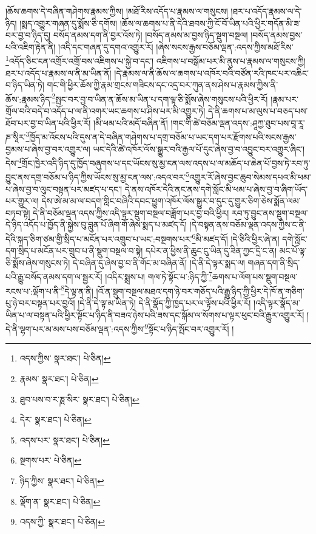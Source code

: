 །ཆོས་ཆགས་དེ་བཞིན་གཤེགས་རྣམས་ཀྱིས། །མཐོ་རིས་འདོད་པ་རྣམས་ལ་གསུངས། །ཐར་པ་འདོད་རྣམས་ལ་དེ་ཉིད། །སྨད་འགྱུར་གཞན་དུ་སྨོས་ཅི་དགོས། །ཆོས་ལ་ཆགས་པ་ནི་དེའི་ཐབས་ཀྱི་ངོ་བོ་ཡིན་པའི་ཕྱིར་གདོན་མི་ཟ་བར་བྱ་བ་ཉིད་དུ། བསོད་ནམས་དག་ནི་བྱར་འོས་ཏེ། །བསོད་ནམས་མ་བྱས་ཉིད་སྡུག་བསྔལ། །བསོད་ནམས་བྱས་པའི་འཇིག་རྟེན་ནི། །འདི་དང་གཞན་དུ་དགའ་འགྱུར་རོ། །ཞེས་སངས་རྒྱས་བཅོམ་ལྡན་:འདས་ཀྱིས་མཐོ་རིས་\footnote{འདས་ཀྱིས་  སྣར་ཐང་།  པེ་ཅིན། }འདོད་ཅིང་ངན་འགྲོར་འགྲོ་བས་འཇིགས་པ་སྐྱེ་བ་དང་། འཇིགས་པ་བསྒོམ་པར་མི་ནུས་པ་རྣམས་ལ་གསུངས་ཀྱི། ཐར་པ་འདོད་པ་རྣམས་ལ་ནི་མ་ཡིན་ནོ། །དེ་རྣམས་ལ་ནི་ཆོས་ལ་ཆགས་པ་འཁོར་བའི་བཙོན་རའི་ཁང་པར་འཆིང་བ་ཉིད་ཡིན་ཏེ། གང་གི་ཕྱིར་ཆོས་ཀྱི་རྣམ་གྲངས་གཟིངས་དང་འདྲ་བར་ཀུན་ནས་ཤེས་པ་རྣམས་ཀྱིས་ནི་ཆོས་:རྣམས་ཉིད་\footnote{རྣམས་  སྣར་ཐང་།  པེ་ཅིན། }སྤང་བར་བྱ་བ་ཡིན་ན་ཆོས་མ་ཡིན་པ་དག་ལྟ་ཅི་སྨོས་ཞེས་གསུངས་པའི་ཕྱིར་རོ། །རྣམ་པར་གྲོལ་བའི་བདེ་བ་འདོད་པ་ལ་ནི་འགར་ཡང་ཆགས་པ་ཤིས་པར་མི་འགྱུར་ཏེ། དེ་ནི་ཆགས་པ་མ་ལུས་པ་བཅད་པས་ཐོབ་པར་བྱ་བ་ཡིན་པའི་ཕྱིར་རོ། །མི་ཕམ་པའི་མདོ་བཞིན་ནོ། །གང་གི་ཚེ་བཅོམ་ལྡན་འདས་:ཤཱཀྱ་ཐུབ་པས་བཱ་རཱ་ཎ་སཱིར་\footnote{ཐུབ་པས་བ་ར་ཎཱ་སིར་  སྣར་ཐང་།  པེ་ཅིན། }ཁྱོད་མ་འོངས་པའི་དུས་ན་དེ་བཞིན་གཤེགས་པ་དགྲ་བཅོམ་པ་ཡང་དག་པར་རྫོགས་པའི་སངས་རྒྱས་བྱམས་པ་ཞེས་བྱ་བར་འགྱུར་ལ། ཡང་དེའི་ཚེ་འཁོར་ལོས་སྒྱུར་བའི་རྒྱལ་པོ་དུང་ཞེས་བྱ་བ་འབྱུང་བར་འགྱུར་ཞིང་། དེས་\footnote{དེར་  སྣར་ཐང་།  པེ་ཅིན། }གྲོང་ཁྱེར་འདི་ཉིད་དུ་ཁྱོད་བཞུགས་པ་དང་ཡོངས་སུ་མྱ་ངན་ལས་འདས་པ་ལ་མཆོད་པ་ཆེན་པོ་བྱས་ཏེ་རབ་ཏུ་བྱུང་ནས་དགྲ་བཅོམ་པ་ཉིད་ཀྱིས་ཡོངས་སུ་མྱ་ངན་ལས་:འདའ་བར་\footnote{འདས་པར་  སྣར་ཐང་།  པེ་ཅིན། }འགྱུར་རོ་ཞེས་བྱང་ཆུབ་སེམས་དཔའ་མི་ཕམ་པ་ཞེས་བྱ་བ་ལུང་བསྟན་པར་མཛད་པ་དང་། དེ་ནས་འཁོར་དེའི་ནང་ནས་དགེ་སློང་མི་ཕམ་པ་ཞེས་བྱ་བ་ཞིག་ཡོད་པར་གྱུར་ལ། དེས་ཨེ་མ་མ་ལ་བདག་གླིང་བཞིའི་དབང་ཕྱུག་འཁོར་ལོས་སྒྱུར་བ་དུང་དུ་གྱུར་ཅིག་ཅེས་སྨོན་ལམ་བཏབ་སྟེ། དེ་ནི་བཅོམ་ལྡན་འདས་ཀྱིས་འདི་ལྟར་སྡུག་བསྔལ་བཟློག་པར་བྱ་བའི་ཕྱིར། རབ་ཏུ་བྱུང་ནས་སྡུག་བསྔལ་དེ་ཉིད་འདོད་པ་ཁྱོད་ནི་སྐྱེས་བུ་བླུན་པོ་ཞིག་གོ་ཞེས་སྨད་པ་མཛད་དོ། །དེ་བསྟན་ནས་བཅོམ་ལྡན་འདས་ཀྱིས་ང་ནི་དེའི་སྐད་ཅིག་ཙམ་གྱི་སྲིད་པ་མངོན་པར་འགྲུབ་པ་ཡང་:བསྔགས་པར་\footnote{སྔགས་པར་  པེ་ཅིན། }མི་མཛད་དོ། །དེ་ཅིའི་ཕྱིར་ཞེ་ན། དགེ་སློང་དག་སྲིད་པ་མངོན་པར་གྲུབ་པ་ནི་སྡུག་བསྔལ་བ་སྟེ། དཔེར་ན་ཕྱིས་ནི་ཆུང་ངུ་ཡིན་དུ་ཟིན་ཀྱང་དྲི་ང་ན། མང་པོ་ལྟ་ཅི་སྨོས་ཞེས་གསུངས་ཏེ། དེ་བཞིན་དུ་ཞེས་བྱ་བ་ནི་གོང་མ་བཞིན་ནོ། །དེ་ནི་དེ་ལྟར་སྨད་ལ། གཞན་དག་ནི་སྲིད་པའི་རྒྱུ་བསོད་ནམས་དག་ལ་སྦྱར་རོ། །འདིར་སྨྲས་པ། གལ་ཏེ་སྟོང་པ་:ཉིད་ཀྱི་\footnote{ཉིད་ཀྱིས་  སྣར་ཐང་།  པེ་ཅིན། }ཆགས་པ་ལོག་པས་སྡུག་བསྔལ་རངས་པ་:ལྡོག་པ་ནི་\footnote{ལྡོག་ན་  སྣར་ཐང་།  པེ་ཅིན། }དེ་ལྟ་ན་ནི། །འོ་ན་སྡུག་བསྔལ་མཐའ་དག་ཉེ་བར་གཅོད་པའི་རྒྱུ་ཉིད་ཀྱི་ཕྱིར་དེ་ཁོ་ན་གཅིག་པུ་ཉེ་བར་བསྟན་པར་བྱའོ། །དེ་ནི་དེ་ལྟ་མ་ཡིན་ཏེ། དེ་ནི་སྣོད་ཀྱི་ཁྱད་པར་ལ་ལྟོས་པའི་ཕྱིར་རོ། །འདི་ལྟར་སྣོད་མ་ཡིན་པ་ལ་བསྟན་པའི་ཕྱིར་སྟོང་པ་ཉིད་ནི་བཟའ་ཉེས་པའི་ཟས་དང་སྐོམ་ལ་སོགས་པ་ལྟར་ཕུང་བའི་རྒྱུར་འགྱུར་རོ། །དེ་ནི་ལྷག་པར་མ་མས་པས་བཅོམ་ལྡན་:འདས་ཀྱིས་\footnote{འདས་ཀྱི་  སྣར་ཐང་།  པེ་ཅིན། }སྟོང་པ་ཉིད་སྤོང་བར་འགྱུར་རོ། །
